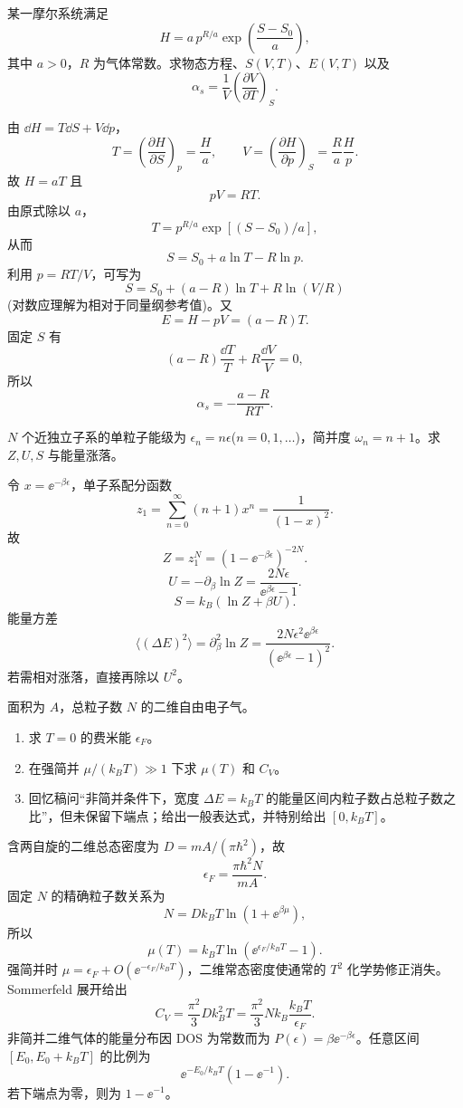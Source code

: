 \begin{question}[15 分]
某一摩尔系统满足
\[H=a\,p^{R/a}\exp\!\left(\frac{S-S_0}{a}\right),\]
其中 $a>0$，$R$ 为气体常数。求物态方程、$S(V,T)$、$E(V,T)$ 以及
\[\alpha_s=\frac1V\left(\frac{\partial V}{\partial T}\right)_S.\]
\begin{solution}
由 $\dd{H}=T\dd{S}+V\dd{p}$，
\[T=\left(\frac{\partial H}{\partial S}\right)_p=\frac{H}{a},\qquad V=\left(\frac{\partial H}{\partial p}\right)_S=\frac{R}{a}\frac{H}{p}.\]
故 $H=aT$ 且
\[\boxed{pV=RT}.\]
由原式除以 $a$，
\[T=p^{R/a}\exp[(S-S_0)/a],\]
从而
\[S=S_0+a\ln T-R\ln p.\]
利用 $p=RT/V$，可写为
\[\boxed{S=S_0+(a-R)\ln T+R\ln(V/R)}\]
(对数应理解为相对于同量纲参考值)。又
\[\boxed{E=H-pV=(a-R)T}.\]
固定 $S$ 有
\[(a-R)\frac{\dd{T}}{T}+R\frac{\dd{V}}{V}=0,\]
所以
\[\boxed{\alpha_s=-\frac{a-R}{RT}}.\]
\end{solution}
\end{question}

\begin{question}[15 分]
$N$ 个近独立子系的单粒子能级为 $\epsilon_n=n\epsilon$($n=0,1,\ldots$)，简并度 $\omega_n=n+1$。求 $Z,U,S$ 与能量涨落。
\begin{solution}
令 $x=\ee^{-\beta\epsilon}$，单子系配分函数
\[z_1=\sum_{n=0}^\infty(n+1)x^n=\frac1{(1-x)^2}.\]
故
\[\boxed{Z=z_1^N=(1-\ee^{-\beta\epsilon})^{-2N}}.\]
\[\boxed{U=-\partial_\beta\ln Z=\frac{2N\epsilon}{\ee^{\beta\epsilon}-1}}.\]
\[\boxed{S=k_B(\ln Z+\beta U)}.\]
能量方差
\[\boxed{\langle(\Delta E)^2\rangle=\partial_\beta^2\ln Z=\frac{2N\epsilon^2\ee^{\beta\epsilon}}{(\ee^{\beta\epsilon}-1)^2}}.\]
若需相对涨落，直接再除以 $U^2$。
\end{solution}
\end{question}

\begin{question}[15 分]
面积为 $A$，总粒子数 $N$ 的二维自由电子气。
\begin{enumerate}
\item 求 $T=0$ 的费米能 $\epsilon_F$。
\item 在强简并 $\mu/(k_BT)\gg1$ 下求 $\mu(T)$ 和 $C_V$。
\item 回忆稿问“非简并条件下，宽度 $\Delta E=k_BT$ 的能量区间内粒子数占总粒子数之比”，但未保留下端点；给出一般表达式，并特别给出 $[0,k_BT]$。
\end{enumerate}
\begin{solution}
含两自旋的二维总态密度为 $D=mA/(\pi\hbar^2)$，故
\[\boxed{\epsilon_F=\frac{\pi\hbar^2N}{mA}}.\]
固定 $N$ 的精确粒子数关系为
\[N=Dk_BT\ln(1+\ee^{\beta\mu}),\]
所以
\[\boxed{\mu(T)=k_BT\ln\!\left(\ee^{\epsilon_F/k_BT}-1\right)}.\]
强简并时 $\mu=\epsilon_F+O(\ee^{-\epsilon_F/k_BT})$，二维常态密度使通常的 $T^2$ 化学势修正消失。Sommerfeld 展开给出
\[\boxed{C_V=\frac{\pi^2}{3}Dk_B^2T=\frac{\pi^2}{3}Nk_B\frac{k_BT}{\epsilon_F}}.\]
非简并二维气体的能量分布因 DOS 为常数而为 $P(\epsilon)=\beta\ee^{-\beta\epsilon}$。任意区间 $[E_0,E_0+k_BT]$ 的比例为
\[\boxed{\ee^{-E_0/k_BT}(1-\ee^{-1})}.\]
若下端点为零，则为 $\boxed{1-\ee^{-1}}$。
\end{solution}
\end{question}

